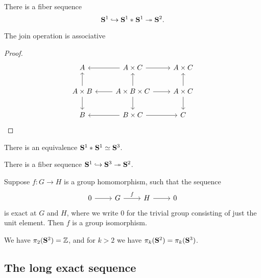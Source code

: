 \begin{cor}
There is a fiber sequence
\begin{equation*}
\mathbf{S}^{1}\hookrightarrow {\mathbf{S}^{1}}\ast_{}{\mathbf{S}^{1}} \twoheadrightarrow \mathbf{S}^{2}.
\end{equation*}
\end{cor}

\begin{lem}
The join operation is associative
\end{lem}

\begin{proof}
\begin{equation*}
\begin{tikzcd}
A & A\times C \arrow[l] \arrow[r] & A\times C \\
A\times B \arrow[u] \arrow[d] & A\times B \times C \arrow[r] \arrow[d] \arrow[l] \arrow[u] & A\times C \arrow[u] \arrow[d] \\
B & B\times C \arrow[l] \arrow[r] & C
\end{tikzcd}
\end{equation*}
\end{proof}

\begin{cor}
There is an equivalence $\eqv{\join{\sphere{1}}{\sphere{1}}}{\sphere{3}}$.
\end{cor}

\begin{thm}
There is a fiber sequence $\mathbf{S}^{1}\hookrightarrow\mathbf{S}^{3}\twoheadrightarrow\mathbf{S}^{2}$. 
\end{thm}

\begin{lem}
Suppose $f:G\to H$ is a group homomorphism, such that the sequence
\begin{equation*}
\begin{tikzcd}
0 \arrow[r] & G \arrow[r,"f"] & H \arrow[r] & 0
\end{tikzcd}
\end{equation*}
is exact at $G$ and $H$, where we write $0$ for the trivial group consisting of just the unit element. Then $f$ is a group isomorphism.
\end{lem}

\begin{cor}
We have $\pi_2(\mathbf{S}^{2})={\mathbb{Z}}$, and for $k>2$ we have $\pi_k(\mathbf{S}^{2})=\pi_k(\mathbf{S}^{3})$.
\end{cor}

\subsection{The long exact sequence}

